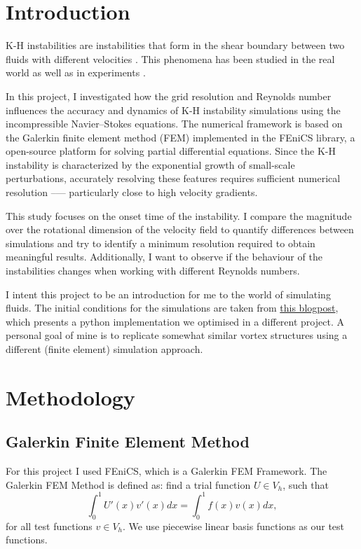 \documentclass[a4paper,12pt]{article}
\begin{document}
\section{Introduction}
\ac{K-H} instabilities are instabilities that form in the shear boundary between two fluids with different velocities \cite{Helmholtz1868}.
This phenomena has been studied in the real world as well as in experiments \cite{DeSilva1996}. 

In this project, I investigated how the grid resolution and Reynolds number influences the accuracy and dynamics of \ac{K-H} instability simulations using the incompressible Navier–Stokes equations.
The numerical framework is based on the Galerkin finite element method (FEM) implemented in the FEniCS library, a open-source platform for solving partial differential equations.
Since the \ac{K-H} instability is characterized by the exponential growth of small-scale perturbations, accurately resolving these features requires sufficient numerical resolution --— particularly close to high velocity gradients.

This study focuses on the onset time of the instability.
I compare the magnitude over the rotational dimension of the velocity field to quantify differences between simulations and try to identify a minimum resolution required to obtain meaningful results.
Additionally, I want to observe if the behaviour of the instabilities changes when working with different Reynolds numbers.

I intent this project to be an introduction for me to the world of simulating fluids.
The initial conditions for the simulations are taken from \href{https://levelup.gitconnected.com/create-your-own-finite-volume-fluid-simulation-with-python-8f9eab0b8305}{this blogpost}, which presents a python implementation we optimised in a different project.
A personal goal of mine is to replicate somewhat similar vortex structures using a different (finite element) simulation approach.

\section{Methodology}
\subsection{Galerkin Finite Element Method}
For this project I used FEniCS, which is a Galerkin \ac{FEM} Framework.
The Galerkin \ac{FEM} Method is defined as: find a trial function $U \in V_h$, such that
\begin{equation}
  \label{eq:galerkinfem}
  \int_0^1 U'(x) v'(x) dx = \int_0^1 f(x) v(x) dx,
\end{equation}
for all test functions $v \in V_h$.
We use piecewise linear basis functions as our test functions.
\end{document}
